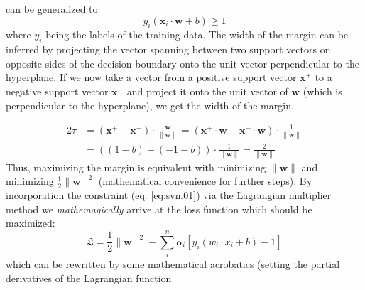 can be generalized to 
\begin{equation}
	\label{eq:svm01}
	y_i(\mathbf{x}_i \cdot \mathbf{w} + b ) \geqslant 1 %
\end{equation}
where $y_i$ being the labels of the training data. 
The width of the margin can be inferred by projecting the vector spanning between two support vectors 
on opposite sides of the decision boundary onto the unit vector perpendicular to the hyperplane. 
If we now take a vector from a positive support vector $\mathbf{x}^+$ to a negative support vector $\mathbf{x}^-$ and project it onto the unit vector of $\mathbf{w}$ (which is perpendicular to the hyperplane), 
we get the width of the margin. 
\iffalse
\begin{equation}
	\label{eq:svm02}
	\begin{aligned} 
		2\tau &= (\mathbf{x}^+ - \mathbf{x}^-) \cdot \frac{\mathbf{w}}{\|\mathbf{w}\|} \\
			&= (x^+ \cdot \mathbf{w} - x^-\cdot \mathbf{w} ) \cdot \frac{1}{\|\mathbf{w}\|} \\
			&= ( (1-b) - (-1-b) ) \cdot \frac{1}{\|\mathbf{w}\|} \\
			&= \frac{2}{\|w\|}
	\end{aligned}
\end{equation}
\fi
\begin{equation}
	\label{eq:svm02}
	\begin{aligned} 
		2\tau &= (\mathbf{x}^+ - \mathbf{x}^-) \cdot \frac{\mathbf{w}}{\|\mathbf{w}\|} 
			= (\mathbf{x}^+ \cdot \mathbf{w} - \mathbf{x}^-\cdot \mathbf{w} ) \cdot \frac{1}{\|\mathbf{w}\|} \\
			&= ( (1-b) - (-1-b) ) \cdot \frac{1}{\|\mathbf{w}\|} 
			= \frac{2}{\|\mathbf{w}\|}
	\end{aligned}
\end{equation}
Thus, maximizing the margin is equivalent with minimizing $\|\mathbf{w}\|$ and minimizing $\frac{1}{2}\|\mathbf{w}\|^2$ (mathematical convenience for further steps).
By incorporation the constraint (eq. \ref{eq:svm01}) via the Lagrangian multiplier method we 
\textit{mathemagically} arrive at the loss function which should be maximized: 
\begin{equation}
	\label{eq:svm03}
	\mathfrak{L} = \frac{1}{2} \|\mathbf{w}\|^2 - \sum_i^n \alpha_i [ y_i ( w_i \cdot x_i + b) -1 ] 
\end{equation}
which can be rewritten by some mathematical 
acrobatics
(setting the partial derivatives of the Lagrangian function
